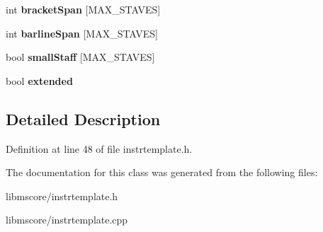 \begin{DoxyCompactItemize}
int {\bfseries bracket\+Span} \mbox{[}M\+A\+X\+\_\+\+S\+T\+A\+V\+ES\mbox{]}
\item 
\mbox{\label{class_ms_1_1_instrument_template_acf9393146f6b1bc51bb92cc3b5984d40}} 
int {\bfseries barline\+Span} \mbox{[}M\+A\+X\+\_\+\+S\+T\+A\+V\+ES\mbox{]}
\item 
\mbox{\label{class_ms_1_1_instrument_template_ab2a067a40e44e883e2f9d76862853921}} 
bool {\bfseries small\+Staff} \mbox{[}M\+A\+X\+\_\+\+S\+T\+A\+V\+ES\mbox{]}
\item 
\mbox{\label{class_ms_1_1_instrument_template_a9a0f4f879c98ef9704fb4ffe8a07a94f}} 
bool {\bfseries extended}
\end{DoxyCompactItemize}


\subsection{Detailed Description}


Definition at line 48 of file instrtemplate.\+h.



The documentation for this class was generated from the following files\+:\begin{DoxyCompactItemize}
\item 
libmscore/instrtemplate.\+h\item 
libmscore/instrtemplate.\+cpp\end{DoxyCompactItemize}
